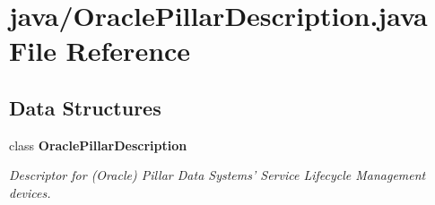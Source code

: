 \section{java/\+Oracle\+Pillar\+Description.java File Reference}
\label{OraclePillarDescription_8java}
\subsection*{Data Structures}
\begin{DoxyCompactItemize}
\item 
class {\bf Oracle\+Pillar\+Description}
\begin{DoxyCompactList}\small\item\em Descriptor for (Oracle) Pillar Data Systems' Service Lifecycle Management devices. \end{DoxyCompactList}\end{DoxyCompactItemize}
